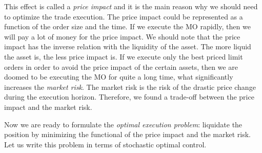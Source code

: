     This effect is called a \emph{price impact} and it is the main reason why we should need to 
    optimize the trade execution. The price impact could be represented as a function of the order size and the time.
    If we execute the MO rapidly, then we will pay a lot of money for the price impact. We should 
    note that the price impact has the inverse relation with the liquidity of the asset. The more liquid the asset is, the less price impact is.
    If we execute only the best priced limit orders in order to avoid the price impact of the certain assets, then we are 
    doomed to be executing the MO for quite a long time, what significantly increases the \emph{market risk}. The market 
    risk is the risk of the drastic price change during the execution horizon. Therefore, we found a trade-off between the 
    price impact and the market risk.
    
    Now we are ready to formulate the \emph{optimal execution problem}: liquidate the position by minimizing the functional of the price impact and the market risk. 
    Let us write this problem in terms of stochastic optimal control.

